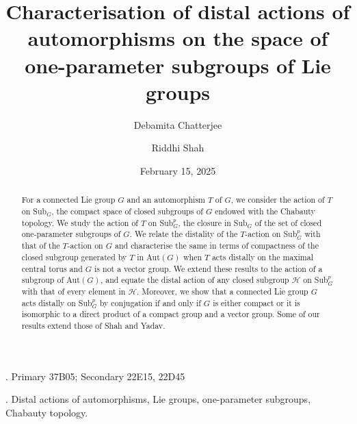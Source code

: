 \documentclass{amsart}
\numberwithin{equation}{section}
\theoremstyle{remark}
\begin{document}
\title[Distal actions on space of one-parameter subgroups]{Characterisation of distal 
actions of automorphisms on the space of one-parameter subgroups of Lie groups}

\author{Debamita Chatterjee}
\address{Debamita Chatterjee\\
School of Physical Sciences\\
Jawaharlal Nehru University\\
New Delhi 110 067}


\author{Riddhi Shah}
\address{Riddhi Shah\\
School of Physical Sciences\\
Jawaharlal Nehru University\\
New Delhi 110 067}

\date{February 15, 2025}

\begin{abstract}
For a connected Lie group $G$ and an automorphism $T$ of $G$, we consider the action of $T$ on Sub$_G$, the  
compact space of closed subgroups of $G$ endowed with the Chabauty topology. We study the 
action of $T$ on Sub$^p_G$, the  closure in Sub$_G$ of the set of closed one-parameter subgroups of $G$. 
We relate the distality of the $T$-action on Sub$^p_G$ with that of the $T$-action on $G$ and characterise 
the same in terms of compactness of the closed subgroup generated by $T$ in Aut$(G)$ when $T$ acts distally 
on the maximal central torus and $G$ is not a vector group. We extend these results to the action of a subgroup
of Aut$(G)$, and equate the distal action of any closed subgroup ${\mathcal H}$ on Sub$^p_G$ 
with that of every element in ${\mathcal H}$. Moreover, we show that a connected Lie group $G$ acts distally 
on Sub$^p_G$ by conjugation if and only if $G$ is either compact or it is isomorphic to a direct product 
of a compact group and a vector group. Some of our results extend those of Shah and Yadav. 
\end{abstract}

\maketitle

{\small 
{}. Primary 37B05; Secondary 22E15, 22D45 

. Distal actions of automorphisms, Lie groups, one-parameter subgroups, Chabauty topology.
}
\end{document}
